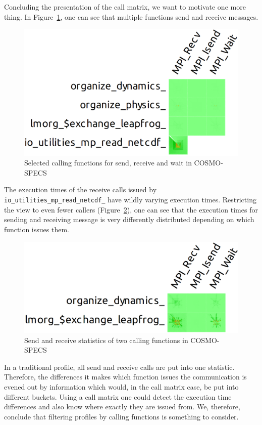 \documentclass[b5paper, final, hauptseminar]{zih-template}
\begin{document}
Concluding the presentation of the call matrix, we want to motivate one more thing.
In Figure~\ref{fig:id-m-cs-1}, one can see that multiple functions send and receive messages.
\begin{figure}[htbp]
	\centering
	\includegraphics[width=0.8\linewidth]{id-m-cs-1}
	\caption{Selected calling functions for send, receive and wait in COSMO-SPECS}
	\label{fig:id-m-cs-1}
\end{figure}
The execution times of the receive calls issued by \\ \texttt{io\_utilities\_mp\_read\_netcdf\_} have wildly varying execution times.
Restricting the view to even fewer callers (Figure~\ref{fig:id-m-cs-2}), one can see that the execution times for sending and receiving message is very differently distributed depending on which function issues them.
\begin{figure}[htbp]
	\centering
	\includegraphics[width=0.8\linewidth]{id-m-cs-2}
	\caption{Send and receive statistics of two calling functions in COSMO-SPECS}
	\label{fig:id-m-cs-2}
\end{figure}
In a traditional profile, all send and receive calls are put into one statistic.
Therefore, the differences it makes which function issues the communication is evened out by information which would, in the call matrix case, be put into different buckets.
Using a call matrix one could detect the execution time differences and also know where exactly they are issued from.
We, therefore, conclude that filtering profiles by calling functions is something to consider.
\end{document}
